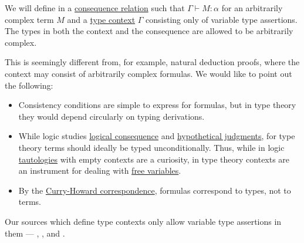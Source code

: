 \begin{remark}\label{rem:type_context_only_variables}
  We will define in  a \hyperref[def:consequence_relation]{consequence relation} such that \( \Gamma \vdash M: \alpha \) for an arbitrarily complex term \( M \) and a \hyperref[def:type_context]{type context} \( \Gamma \) consisting only of variable type assertions. The types in both the context and the consequence are allowed to be arbitrarily complex.

  This is seemingly different from, for example, natural deduction proofs, where the context may consist of arbitrarily complex formulas. We would like to point out the following:
  \begin{itemize}
    \item Consistency conditions are simple to express for formulas, but in type theory they would depend circularly on typing derivations.

    \item While logic studies \hyperref[def:consequence_relation]{logical consequence} and \hyperref[con:hypothetical_judgment]{hypothetical judgments}, for type theory terms should ideally be typed unconditionally. Thus, while in logic \hyperref[def:propositional_tautology]{tautologies} with empty contexts are a curiosity, in type theory contexts are an instrument for dealing with \hyperref[def:lambda_variable_freeness]{free variables}.

    \item By the \hyperref[con:curry_howard_correspondence]{Curry-Howard correspondence}, formulas correspond to types, not to terms.
  \end{itemize}

  Our sources which define type contexts only allow variable type assertions in them ---
  ,
  ,
   and
  .
\end{remark}

